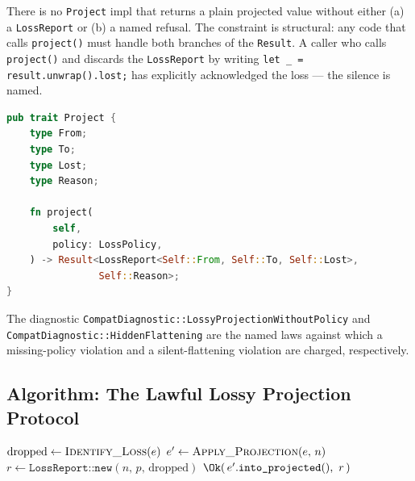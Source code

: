There is no \texttt{Project} impl that returns a plain projected value without
either (a) a \texttt{LossReport} or (b) a named refusal. The constraint is
structural: any code that calls \texttt{project()} must handle both branches of
the \texttt{Result}. A caller who calls \texttt{project()} and discards the
\texttt{LossReport} by writing \texttt{let \_ = result.unwrap().lost;} has
explicitly acknowledged the loss --- the silence is named.

\begin{lstlisting}[language=Rust, caption={The \texttt{Project} trait.
  Silent loss is structurally impossible: every implementation must return
  either a \texttt{LossReport} or a named refusal.}, label={lst:project-trait}]
pub trait Project {
    type From;
    type To;
    type Lost;
    type Reason;

    fn project(
        self,
        policy: LossPolicy,
    ) -> Result<LossReport<Self::From, Self::To, Self::Lost>,
                Self::Reason>;
}
\end{lstlisting}

The diagnostic \texttt{CompatDiagnostic::LossyProjectionWithoutPolicy} and
\texttt{CompatDiagnostic::HiddenFlattening} are the named laws against which a
missing-policy violation and a silent-flattening violation are charged,
respectively.

\subsection{Algorithm: The Lawful Lossy Projection Protocol}

\begin{algorithm}[H]
  \caption{Lawful Lossy Projection}
  \label{alg:lossy-projection}
  \DontPrintSemicolon
  \BlankLine
  $\text{dropped} \leftarrow \textsc{Identify\_Loss}(e)$\;
  \BlankLine
  \BlankLine
  $e' \leftarrow \textsc{Apply\_Projection}(e,\, n)$\;
  \BlankLine
  $r \leftarrow \texttt{LossReport::new}(n,\, p,\, \text{dropped})$\;
  \BlankLine
  \Return $\Ok\!\left(\, e'.\texttt{into\_projected}(),\ r \,\right)$\;
\end{algorithm}

